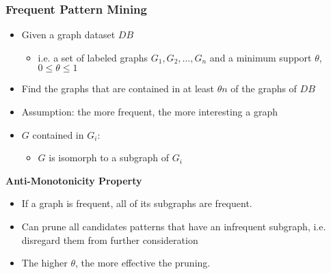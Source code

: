 \documentclass[../notes.tex]{subfiles}
\begin{document}
\subsubsection{Frequent Pattern Mining}
\begin{itemize}
  \item Given a graph dataset $DB$
  \begin{itemize}
    \item i.e. a set of labeled graphs $G_1, G_2, ..., G_n$ and a minimum support $\theta$, $0 \le \theta \le 1$
  \end{itemize}

  \item Find the graphs that are contained in at least $\theta n$ of the graphs of $DB$
  \item Assumption: the more frequent, the more interesting a graph
  \item $G$ contained in $G_i$:
  \begin{itemize}
    \item $G$ is isomorph to a subgraph of $G_i$
  \end{itemize}
\end{itemize}

\textbf{Anti-Monotonicity Property}
\begin{itemize}
  \item If a graph is frequent, all of its subgraphs are frequent.
  \item Can prune all candidates patterns that have an infrequent subgraph, i.e. disregard them from further consideration
  \item The higher $\theta$, the more effective the pruning.
\end{itemize}
\end{document}
